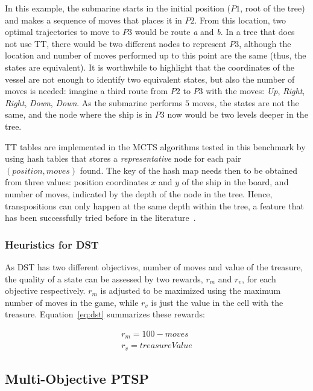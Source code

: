 \documentclass[journal]{IEEEtran}
\begin{document}
In this example, the submarine starts in the initial position ($P1$, root of the tree) and makes a sequence of moves that places it in $P2$. From this location, two optimal trajectories to move to $P3$ would be route \textit{a} and \textit{b}. In a tree that does not use TT, there would be two different nodes to represent $P3$, although the location and number of moves performed up to this point are the same (thus, the states are equivalent). It is worthwhile to highlight that the coordinates of the vessel are not enough to identify two equivalent states, but also the number of moves is needed: imagine a third route from $P2$ to $P3$ with the moves: \textit{Up}, \textit{Right}, \textit{Right}, \textit{Down}, \textit{Down}. As the submarine performs $5$ moves, the states are not the same, and the node where the ship is in $P3$ now would be two levels deeper in the tree.

TT tables are implemented in the MCTS algorithms tested in this benchmark by using hash tables that stores a \textit{representative} node for each pair $(position, moves)$ found.  The key of the hash map needs then to be obtained from three values: position coordinates $x$ and $y$ of the ship in the board, and number of moves, indicated by the depth of the node in the tree. Hence, transpositions can only happen at the same depth within the tree, a feature that has been successfully tried before in the literature~\cite{Kozelek2009}.

\subsubsection{Heuristics for DST} \label{sssec:heurDST}

As DST has two different objectives, number of moves and value of the treasure, the quality of a state can be assessed by two rewards, $r_m$ and $r_v$, for each objective respectively. $r_m$ is adjusted to be maximized using the maximum number of moves in the game, while $r_v$ is just the value in the cell with the treasure. Equation~\ref{eq:dst} summarizes these rewards:

\begin{equation}	\label{eq:dst}
\begin{split}
r_m = 100 - moves \\
r_v = treasureValue
\end{split}
\end{equation}


\subsection{Multi-Objective PTSP} \label{ssec:moptsp}
\end{document}
